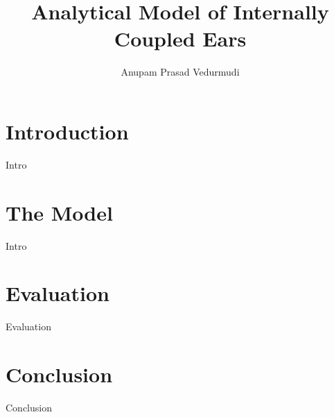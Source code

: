 \documentclass{beamer}
\title{Analytical Model of Internally Coupled Ears}
\author{Anupam Prasad Vedurmudi}
\begin{document}
\begin{frame}
 \titlepage
\end{frame}

\section{Introduction}
\begin{frame}
 Intro
\end{frame}

\section{The Model}
\begin{frame}
 Intro
\end{frame}

\section{Evaluation}
\begin{frame}
 Evaluation
\end{frame}

\section{Conclusion}
\begin{frame}
 Conclusion
\end{frame}
\end{document}
